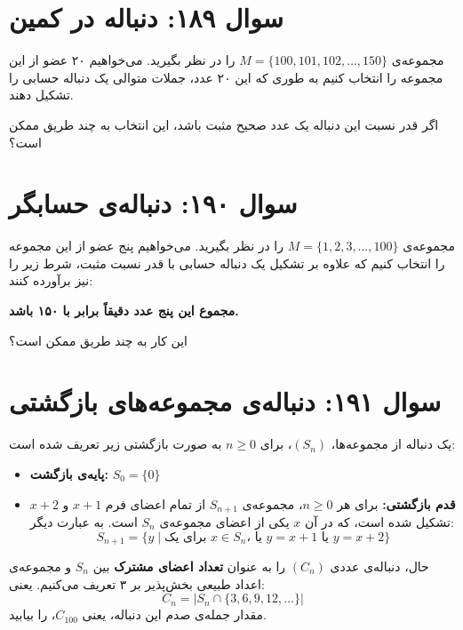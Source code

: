 \documentclass[12pt]{article}
\begin{document}
\section*{سوال ۱۸۹: دنباله در کمین}
مجموعه‌ی \(M = \{100, 101, 102, \dots, 150\}\) را در نظر بگیرید. می‌خواهیم ۲۰ عضو از این مجموعه را انتخاب کنیم به طوری که این ۲۰ عدد، جملات متوالی یک دنباله حسابی را تشکیل دهند.


اگر قدر نسبت این دنباله یک عدد صحیح مثبت باشد، این انتخاب به چند طریق ممکن است؟




\vspace{1cm}
\hrulefill
\vspace{1cm}



\section*{سوال ۱۹۰: دنباله‌ی حسابگر}
مجموعه‌ی \(M = \{1, 2, 3, \dots, 100\}\) را در نظر بگیرید. می‌خواهیم پنج عضو از این مجموعه را انتخاب کنیم که علاوه بر تشکیل یک دنباله حسابی با قدر نسبت مثبت، شرط زیر را نیز برآورده کنند:
\begin{center}
	\textbf{مجموع این پنج عدد دقیقاً برابر با ۱۵۰ باشد.}
\end{center}
\vspace{0.5cm}
این کار به چند طریق ممکن است؟



\vspace{1cm}
\hrulefill
\vspace{1cm}



\section*{سوال ۱۹۱: دنباله‌ی مجموعه‌های بازگشتی}
یک دنباله از مجموعه‌ها، \( (S_n) \)، برای \(n \ge 0\) به صورت بازگشتی زیر تعریف شده است:
\begin{itemize}
	\item \textbf{پایه‌ی بازگشت:} \(S_0 = \{0\}\)
	\item \textbf{قدم بازگشتی:} برای هر \(n \ge 0\)، مجموعه‌ی \(S_{n+1}\) از تمام اعضای فرم \(x+1\) و \(x+2\) تشکیل شده است، که در آن \(x\) یکی از اعضای مجموعه‌ی \(S_n\) است. به عبارت دیگر:
	\[ S_{n+1} = \{ y \mid \text{برای یک } x \in S_n \text{، یا } y=x+1 \text{ یا } y=x+2 \} \]
\end{itemize}
\vspace{0.5cm}
حال، دنباله‌ی عددی \( (C_n) \) را به عنوان \textbf{تعداد اعضای مشترک} بین \(S_n\) و مجموعه‌ی اعداد طبیعی بخش‌پذیر بر ۳ تعریف می‌کنیم. یعنی:
\[ C_n = |S_n \cap \{3, 6, 9, 12, \dots\}| \]
\vspace{0.5cm}
مقدار جمله‌ی صدم این دنباله، یعنی \(C_{100}\)، را بیابید.
\end{document}
